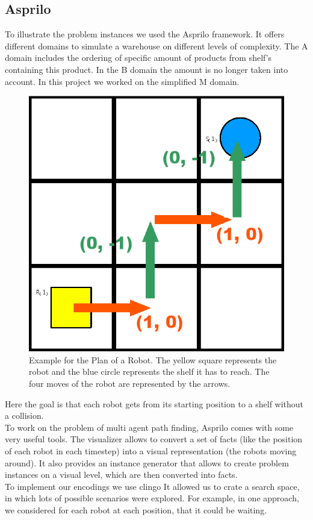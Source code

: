 \documentclass{llncs}
\begin{document}
\subsection{Asprilo}
To illustrate the problem instances we used the Asprilo \cite{asprilo} framework. It offers different domains to simulate a warehouse on different levels of complexity. The A domain includes the ordering of specific amount of products from shelf's containing this product. In the B domain the amount is no longer taken into account. In this project we worked on the simplified M domain. 
\begin{figure}
\centering
\includegraphics[width=.3\textwidth]{images/example_plan.PNG}
\caption{Example for the Plan of a Robot. The yellow square represents the robot and the blue circle represents the shelf it has to reach. The four moves of the robot are represented by the arrows.} \label{fig1}
\vspace{-20pt}
\end{figure}
Here the  goal is that each robot gets from its starting position to a shelf without a collision.\\
To work on the problem of multi agent path finding, Asprilo comes with some very useful tools. 
The visualizer
allows to convert a set of facts (like the position of each robot in each timestep) into a visual representation (the robots moving around). It also provides an instance generator that allows to create problem instances on a visual level, which are then converted into facts. \\
To implement our encodings we use clingo It allowed us to crate a search space, in which lots of possible scenarios were explored. For example, in one approach, we considered for each robot at each position, that it could be waiting.\\
\end{document}
